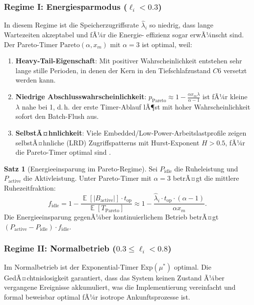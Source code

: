 ﻿\documentclass[a4paper,12pt]{scrreprt}
\theoremstyle{definition}
\newtheorem{satz}{Satz}[section]
\DeclareMathOperator{\E}{\mathbb{E}}
\newcommand{\Exp}{\mathrm{Exp}}
\newcommand{\Pareto}{\mathrm{Pareto}}
\begin{document}
	\subsubsection{Regime I: Energiesparmodus ($\ell_i < 0.3$)}
	
	In diesem Regime ist die Speicherzugriffsrate $\hat\lambda_i$ so
	niedrig, dass lange Wartezeiten akzeptabel und fÃ¼r die Energie-
	effizienz sogar erwÃ¼nscht sind. Der Pareto-Timer
	$\Pareto(\alpha, x_m)$ mit $\alpha = 3$ ist optimal, weil:
	
	\begin{enumerate}[noitemsep]
		\item \textbf{Heavy-Tail-Eigenschaft}: Mit positiver Wahrscheinlichkeit
		entstehen sehr lange stille Perioden, in denen der Kern in den
		Tiefschlafzustand $C6$ versetzt werden kann.
		\item \textbf{Niedrige Abschlusswahrscheinlichkeit}: $p_{\Pareto} \approx 1 -
		\frac{\alpha x_m \lambda}{\alpha-1}$ ist fÃ¼r kleine $\lambda$
		nahe bei 1, d.\,h. der erste Timer-Ablauf lÃ¶st mit hoher
		Wahrscheinlichkeit sofort den Batch-Flush aus.
		\item \textbf{SelbstÃ¤hnlichkeit}: Viele Embedded/Low-Power-Arbeitslastprofile
		zeigen selbstÃ¤hnliche (LRD) Zugriffspatterns mit Hurst-Exponent
		$H > 0.5$, fÃ¼r die Pareto-Timer optimal sind \cite{epp2026archiv}.
	\end{enumerate}
	
	\begin{satz}[Energieeinsparung im Pareto-Regime]
		\label{satz:energy_pareto}
		Sei $P_{\mathrm{idle}}$ die Ruheleistung und $P_{\mathrm{active}}$ die
		Aktivleistung. Unter Pareto-Timer mit $\alpha = 3$ betrÃ¤gt die
		mittlere Ruhezeitfraktion:
		\[
		f_{\mathrm{idle}} = 1 - \frac{\E[|B_{\mathrm{active}}|] \cdot t_{\mathrm{op}}}
		{\E[T_{\Pareto}]}
		\approx 1 - \frac{\hat\lambda_i \cdot t_{\mathrm{op}} \cdot (\alpha-1)}{\alpha x_m}.
		\]
		Die Energieeinsparung gegenÃ¼ber kontinuierlichem Betrieb betrÃ¤gt
		$(P_{\mathrm{active}} - P_{\mathrm{idle}}) \cdot f_{\mathrm{idle}}$.
	\end{satz}
	
	\subsubsection{Regime II: Normalbetrieb ($0.3 \le \ell_i < 0.8$)}
	
	Im Normalbetrieb ist der Exponential-Timer $\Exp(\mu^*)$ optimal.
	Die GedÃ¤chtnislosigkeit garantiert, dass das System keinen Zustand
	Ã¼ber vergangene Ereignisse akkumuliert, was die Implementierung
	vereinfacht und formal beweisbar optimal fÃ¼r isotrope Ankunftsprozesse
	ist.
	
\end{document}
